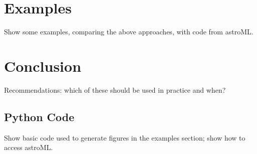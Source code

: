 \documentclass[12pt]{article}
\begin{document}
\citep{Scargle1998, Scargle2012}

\section{Examples}
\label{sec:examples}
Show some examples, comparing the above approaches, with code from astroML.

\section{Conclusion}
\label{sec:conclusion}
Recommendations: which of these should be used in practice and when?



\begin{appendix}
\section{Python Code}
Show basic code used to generate figures in the examples section;
show how to access astroML.


\end{appendix}
\end{document}
